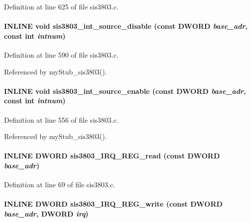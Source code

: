 Definition at line 625 of file sis3803.c.
\paragraph[{sis3803\_\-int\_\-source\_\-disable}]{\setlength{\rightskip}{0pt plus 5cm}INLINE void sis3803\_\-int\_\-source\_\-disable (const {\bf DWORD} {\em base\_\-adr}, \/  const int {\em intnum})}\hfill\label{sis3803_8h_ae710f91ba05a4d828a0a5d3b21848673}


Definition at line 590 of file sis3803.c.

Referenced by myStub\_\-sis3803().
\paragraph[{sis3803\_\-int\_\-source\_\-enable}]{\setlength{\rightskip}{0pt plus 5cm}INLINE void sis3803\_\-int\_\-source\_\-enable (const {\bf DWORD} {\em base\_\-adr}, \/  const int {\em intnum})}\hfill\label{sis3803_8h_a01ec0bc5dda3f74b2fcb9e644104b411}


Definition at line 556 of file sis3803.c.

Referenced by myStub\_\-sis3803().
\paragraph[{sis3803\_\-IRQ\_\-REG\_\-read}]{\setlength{\rightskip}{0pt plus 5cm}INLINE {\bf DWORD} sis3803\_\-IRQ\_\-REG\_\-read (const {\bf DWORD} {\em base\_\-adr})}\hfill\label{sis3803_8h_a69b1dfd744d5baf274bc11e65c59aa30}


Definition at line 69 of file sis3803.c.
\paragraph[{sis3803\_\-IRQ\_\-REG\_\-write}]{\setlength{\rightskip}{0pt plus 5cm}INLINE {\bf DWORD} sis3803\_\-IRQ\_\-REG\_\-write (const {\bf DWORD} {\em base\_\-adr}, \/  {\bf DWORD} {\em irq})}\hfill\label{sis3803_8h_a1a6674b03260b1ade32330dc0525694a}


